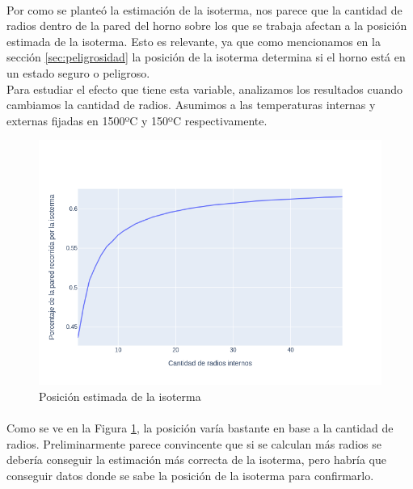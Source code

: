 \documentclass[12pt]{article}
\begin{document}
\paragraph{} Por como se planteó la estimación de la isoterma, nos parece que la cantidad de radios dentro de la pared del horno sobre los que se trabaja afectan a la posición estimada de la isoterma. Esto es relevante, ya que como mencionamos en la sección \ref{sec:peligrosidad} la posición de la isoterma determina si el horno está en un estado seguro o peligroso. \\
Para estudiar el efecto que tiene esta variable, analizamos los resultados cuando cambiamos la cantidad de radios. Asumimos a las temperaturas internas y externas fijadas en 1500ºC y 150ºC respectivamente. \\

\begin{figure}[H]
\centering
\includegraphics[scale=0.5]{isotherm_by_radii}
\caption{Posición estimada de la isoterma}
\label{fig:isotherm_by_radii}
\end{figure}

\paragraph{} Como se ve en la Figura \ref{fig:isotherm_by_radii}, la posición varía bastante en base a la cantidad de radios. Preliminarmente parece convincente que si se calculan más radios se debería conseguir la estimación más correcta de la isoterma, pero habría que conseguir datos donde se sabe la posición de la isoterma para confirmarlo.

\end{document}
